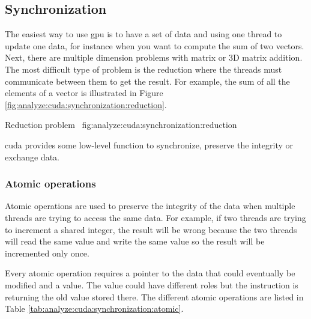 \subsection{Synchronization}
\label{ch:analyze:cuda:synchronization}

The easiest way to use \acrshort{gpu} is to have a set of data and using one
thread to update one data, for instance when you want to compute the sum of two
vectors.
Next, there are multiple dimension problems with matrix or 3D matrix addition.
The most difficult type of problem is the reduction where the threads must
communicate between them to get the result. For example, the sum of all the
elements of a vector is illustrated in Figure \ref{fig:analyze:cuda:synchronization:reduction}.

{Reduction problem~\cite{cuda-training}}
{fig:analyze:cuda:synchronization:reduction}

\acrshort{cuda} provides some low-level function to synchronize, preserve the
integrity or exchange data.

\subsubsection{Atomic operations}
\label{ch:analyze:cuda:synchronization:atomic}

Atomic operations are used to preserve the integrity of the data when multiple
threads are trying to access the same data.
For example, if two threads are trying to increment a shared integer, the
result will be wrong because the two threads will read the same value and write
the same value so the result will be incremented only once.

Every atomic operation requires a pointer to the data that could eventually be
modified and a value.
The value could have different roles but the instruction is returning the old
value stored there.
The different atomic operations are listed in Table \ref{tab:analyze:cuda:synchronization:atomic}.

